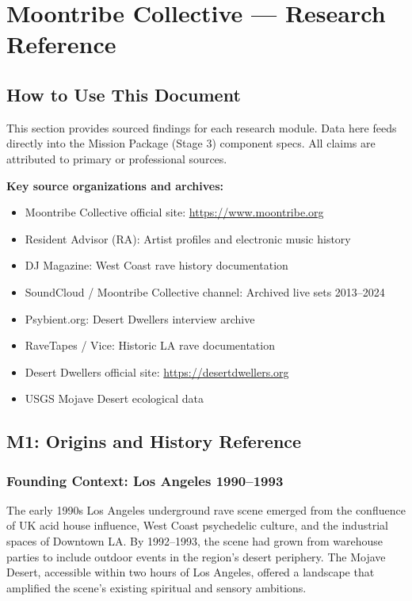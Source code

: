 \documentclass[11pt,letterpaper]{article}
\newcommand{\stageheader}[2]{%
  \noindent\colorbox{#2}{\makebox[\textwidth][l]{%
    \textcolor{white}{\bfseries\sffamily\hspace{6pt}#1\hspace{6pt}}}}%
  \vspace{0.5em}\par%
}
\begin{document}
\newpage
\stageheader{STAGE 2 --- RESEARCH REFERENCE}{secondary}

\section{Moontribe Collective --- Research Reference}

\subsection{How to Use This Document}

This section provides sourced findings for each research module. Data here feeds directly into the Mission Package (Stage 3) component specs. All claims are attributed to primary or professional sources.

\textbf{Key source organizations and archives:}
\begin{itemize}[nosep]
  \item Moontribe Collective official site: \url{https://www.moontribe.org}
  \item Resident Advisor (RA): Artist profiles and electronic music history
  \item DJ Magazine: West Coast rave history documentation
  \item SoundCloud / Moontribe Collective channel: Archived live sets 2013--2024
  \item Psybient.org: Desert Dwellers interview archive
  \item RaveTapes / Vice: Historic LA rave documentation
  \item Desert Dwellers official site: \url{https://desertdwellers.org}
  \item USGS Mojave Desert ecological data
\end{itemize}

\subsection{M1: Origins and History Reference}

\subsubsection{Founding Context: Los Angeles 1990--1993}

The early 1990s Los Angeles underground rave scene emerged from the confluence of UK acid house influence, West Coast psychedelic culture, and the industrial spaces of Downtown LA. By 1992--1993, the scene had grown from warehouse parties to include outdoor events in the region's desert periphery. The Mojave Desert, accessible within two hours of Los Angeles, offered a landscape that amplified the scene's existing spiritual and sensory ambitions.
\end{document}

